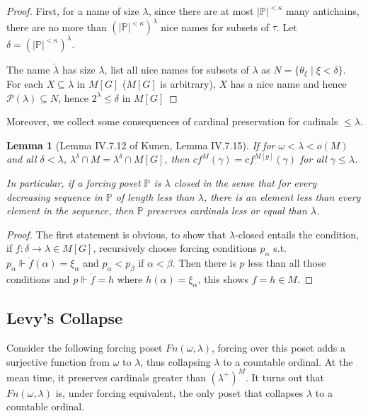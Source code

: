 \documentclass{article}
\newtheorem{lemma}{Lemma}
\newcommand{\bbP}{\mathbb{P}}
\begin{document}
\begin{proof}
    First, for a name of size $\lambda$, since there are at most $|\bbP|^{<\kappa}$ many antichains, there are no more than $(|\bbP|^{<\kappa})^\lambda$ nice names for subsets of $\tau$. Let $\delta = (|\bbP|^{<\kappa})^\lambda$.
    
    The name $\check{\lambda}$ has size $\lambda$, list all nice names for subsets of $\lambda$ as $N = \{\theta_\xi\mid \xi<\delta\}$. For each $X\subseteq \lambda$ in $M[G]$ ($M[G]$ is arbitrary), $X$ has a nice name and hence $ \mathcal{P}(\lambda)\subseteq N$, hence $2^\lambda \leq \delta$ in $M[G]$
\end{proof}

Moreover, we collect some consequences of cardinal preservation for cadinals $\leq\lambda$.

\begin{lemma}[Lemma IV.7.12 of Kunen, Lemma IV.7.15]
    If for $\omega< \lambda<o(M)$ and all $\delta<\lambda$, $\lambda^\delta\cap M= \lambda^\delta \cap M[G]$, then $cf^M(\gamma) = cf^{M[g]}(\gamma)$ for all $\gamma\leq \lambda$. 

    In particular, if a forcing poset $\bbP$ is $\lambda$ closed in the sense that for every decreasing sequence in $\bbP$ of length less than $\lambda$, there is an element less than every element in the sequence, then $\bbP$ preserves cardinals less or equal than $\lambda$.
\end{lemma}

\begin{proof}
    The first statement is obvious, to show that $\lambda$-closed entails the condition, if $f: \delta\to \lambda\in M[G]$, recursively choose forcing conditions $p_\alpha$ s.t. $p_\alpha\Vdash \dot{f}(\alpha) = \xi_\alpha$ and $p_\alpha<p_\beta$ if $\alpha<\beta$. Then there is $p$ less than all those conditions and $p\Vdash \dot{f} = h$ where $h(\alpha) = \xi_\alpha$, this shows $f = h\in M$.
\end{proof}





\subsection{Levy's Collapse}

Consider the following forcing poset $Fn(\omega,\lambda)$, forcing over this poset adds a surjective function from $\omega$ to $\lambda$, thus collapsing $\lambda$ to a countable ordinal. At the mean time, it preserves cardinals greater than $(\lambda^+)^M$. It turns out that $Fn(\omega,\lambda)$ is, under forcing equivalent, the only poset that collapses $\lambda$ to a countable ordinal.
\end{document}
